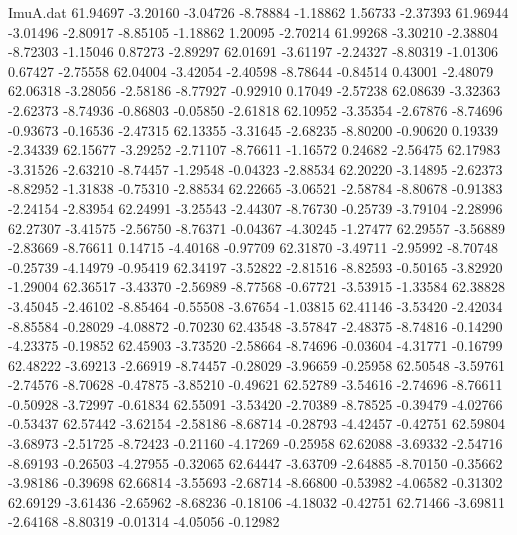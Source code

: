\begin{filecontents}{ImuA.dat}
  61.94697   -3.20160   -3.04726   -8.78884   -1.18862    1.56733   -2.37393
  61.96944   -3.01496   -2.80917   -8.85105   -1.18862    1.20095   -2.70214
  61.99268   -3.30210   -2.38804   -8.72303   -1.15046    0.87273   -2.89297
  62.01691   -3.61197   -2.24327   -8.80319   -1.01306    0.67427   -2.75558
  62.04004   -3.42054   -2.40598   -8.78644   -0.84514    0.43001   -2.48079
  62.06318   -3.28056   -2.58186   -8.77927   -0.92910    0.17049   -2.57238
  62.08639   -3.32363   -2.62373   -8.74936   -0.86803   -0.05850   -2.61818
  62.10952   -3.35354   -2.67876   -8.74696   -0.93673   -0.16536   -2.47315
  62.13355   -3.31645   -2.68235   -8.80200   -0.90620    0.19339   -2.34339
  62.15677   -3.29252   -2.71107   -8.76611   -1.16572    0.24682   -2.56475
  62.17983   -3.31526   -2.63210   -8.74457   -1.29548   -0.04323   -2.88534
  62.20220   -3.14895   -2.62373   -8.82952   -1.31838   -0.75310   -2.88534
  62.22665   -3.06521   -2.58784   -8.80678   -0.91383   -2.24154   -2.83954
  62.24991   -3.25543   -2.44307   -8.76730   -0.25739   -3.79104   -2.28996
  62.27307   -3.41575   -2.56750   -8.76371   -0.04367   -4.30245   -1.27477
  62.29557   -3.56889   -2.83669   -8.76611    0.14715   -4.40168   -0.97709
  62.31870   -3.49711   -2.95992   -8.70748   -0.25739   -4.14979   -0.95419
  62.34197   -3.52822   -2.81516   -8.82593   -0.50165   -3.82920   -1.29004
  62.36517   -3.43370   -2.56989   -8.77568   -0.67721   -3.53915   -1.33584
  62.38828   -3.45045   -2.46102   -8.85464   -0.55508   -3.67654   -1.03815
  62.41146   -3.53420   -2.42034   -8.85584   -0.28029   -4.08872   -0.70230
  62.43548   -3.57847   -2.48375   -8.74816   -0.14290   -4.23375   -0.19852
  62.45903   -3.73520   -2.58664   -8.74696   -0.03604   -4.31771   -0.16799
  62.48222   -3.69213   -2.66919   -8.74457   -0.28029   -3.96659   -0.25958
  62.50548   -3.59761   -2.74576   -8.70628   -0.47875   -3.85210   -0.49621
  62.52789   -3.54616   -2.74696   -8.76611   -0.50928   -3.72997   -0.61834
  62.55091   -3.53420   -2.70389   -8.78525   -0.39479   -4.02766   -0.53437
  62.57442   -3.62154   -2.58186   -8.68714   -0.28793   -4.42457   -0.42751
  62.59804   -3.68973   -2.51725   -8.72423   -0.21160   -4.17269   -0.25958
  62.62088   -3.69332   -2.54716   -8.69193   -0.26503   -4.27955   -0.32065
  62.64447   -3.63709   -2.64885   -8.70150   -0.35662   -3.98186   -0.39698
  62.66814   -3.55693   -2.68714   -8.66800   -0.53982   -4.06582   -0.31302
  62.69129   -3.61436   -2.65962   -8.68236   -0.18106   -4.18032   -0.42751
  62.71466   -3.69811   -2.64168   -8.80319   -0.01314   -4.05056   -0.12982

\end{filecontents}
